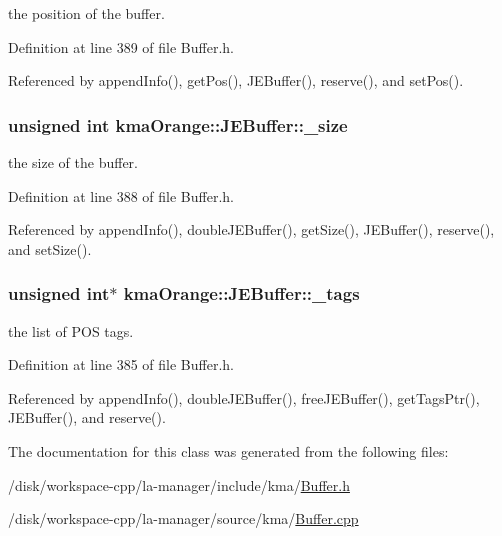 the position of the buffer. 



Definition at line 389 of file Buffer.h.

Referenced by appendInfo(), getPos(), JEBuffer(), reserve(), and setPos().\hypertarget{classkmaOrange_1_1JEBuffer_a6cc6d994de00fa730148f6b63abdab8}{
\subsubsection[{\_\-size}]{\setlength{\rightskip}{0pt plus 5cm}unsigned int {\bf kmaOrange::JEBuffer::\_\-size}}}
\label{classkmaOrange_1_1JEBuffer_a6cc6d994de00fa730148f6b63abdab8}


the size of the buffer. 



Definition at line 388 of file Buffer.h.

Referenced by appendInfo(), doubleJEBuffer(), getSize(), JEBuffer(), reserve(), and setSize().\hypertarget{classkmaOrange_1_1JEBuffer_0b50e5baadc2fa26a8fec01cde35ef9f}{
\subsubsection[{\_\-tags}]{\setlength{\rightskip}{0pt plus 5cm}unsigned int$\ast$ {\bf kmaOrange::JEBuffer::\_\-tags}}}
\label{classkmaOrange_1_1JEBuffer_0b50e5baadc2fa26a8fec01cde35ef9f}


the list of POS tags. 



Definition at line 385 of file Buffer.h.

Referenced by appendInfo(), doubleJEBuffer(), freeJEBuffer(), getTagsPtr(), JEBuffer(), and reserve().

The documentation for this class was generated from the following files:\begin{CompactItemize}
\item 
/disk/workspace-cpp/la-manager/include/kma/\hyperlink{Buffer_8h}{Buffer.h}\item 
/disk/workspace-cpp/la-manager/source/kma/\hyperlink{Buffer_8cpp}{Buffer.cpp}\end{CompactItemize}

